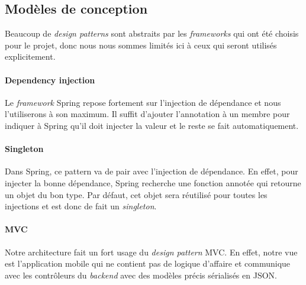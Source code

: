 	\subsection{Modèles de conception}
	Beaucoup de \emph{design patterns} sont abstraits par les \emph{frameworks} qui ont été choisis pour le projet, donc nous nous sommes limités ici à ceux qui seront utilisés explicitement.
	\paragraph{Dependency injection} Le \emph{framework} Spring repose fortement sur l’injection de dépendance et nous l’utiliserons à son maximum. Il suffit d’ajouter l’annotation  à un membre pour indiquer à Spring qu’il doit injecter la valeur et le reste se fait automatiquement.
	\paragraph{Singleton} Dans Spring, ce pattern va de pair avec l’injection de dépendance. En effet, pour injecter la bonne dépendance, Spring recherche une fonction annotée  qui retourne un objet du bon type. Par défaut, cet objet sera réutilisé pour toutes les injections et est donc de fait un \emph{singleton}.
	\paragraph{MVC} Notre architecture fait un fort usage du \emph{design pattern} MVC. En effet, notre vue est l’application mobile qui ne contient pas de logique d’affaire et communique avec les contrôleurs du \emph{backend} avec des modèles précis sérialisés en JSON. 